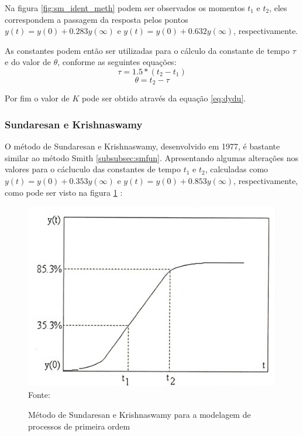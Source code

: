 Na figura \ref{fig:sm_ident_meth} podem ser observados os momentos $t_1$ e $t_2$, eles correspondem a passagem da resposta
pelos pontos $y(t) = y(0) + 0.283y(\infty)$ e $y(t) = y(0) + 0.632y(\infty)$, respectivamente.

As constantes podem então ser utilizadas para o cálculo da constante de tempo $\tau$ e do valor de $\theta$,
conforme as seguintes equações:
\begin{equation}
    \label{eq:smtau}
    \tau = 1.5*(t_2 - t_1)
\end{equation}
\begin{equation}
    \label{eq:smtheta}
    \theta = t_2 - \tau
\end{equation}

Por fim o valor de $K$ pode ser obtido através da equação \eqref{eq:dydu}.

\subsubsection{Sundaresan e Krishnaswamy}\label{subsubsec:skfun}

O método de Sundaresan e Krishnaswamy, desenvolvido em 1977, é bastante similar ao método Smith \ref{subsubsec:smfun}.
Apresentando algumas alterações nos valores para o cácluculo das constantes de tempo $t_1$ e $t_2$, calculadas como
$y(t) = y(0) + 0.353y(\infty)$ e $y(t) = y(0) + 0.853y(\infty)$, respectivamente, como pode ser visto na figura
\ref{fig:sd_kr_ident_meth} \cite{CoelhoIdentificacao}:


\begin{figure}[H]
    \centering
    \caption{Método de Sundaresan e Krishnaswamy para a modelagem de processos de primeira ordem }
    \includegraphics[scale=0.3]{figuras/sd_kr_ident_meth}
    \label{fig:sd_kr_ident_meth}
    \\
    \vspace{0cm}\hspace{0cm}\small{Fonte: \cite{CoelhoIdentificacao}}
\end{figure}

